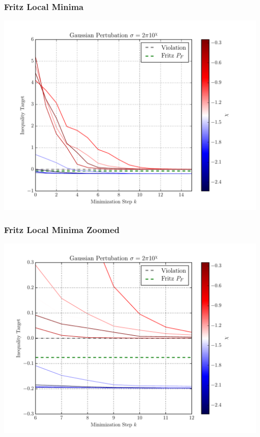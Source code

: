 \documentclass[
    hyperref={bookmarks=false},%
    xcolor={dvipsnames},
]{beamer}
\begin{document}
\begin{frame}
    \frametitle{Fritz Local Minima}
    \includegraphics[width=\linewidth]{../../figures/optimizations/Gaussian_Perturbation_Fritz_Color_Default.pdf}
\end{frame}

\begin{frame}
    \frametitle{Fritz Local Minima Zoomed}
    \includegraphics[width=\linewidth]{../../figures/optimizations/Gaussian_Perturbation_Fritz_Color_Zoomed.pdf}
\end{frame}
\end{document}
